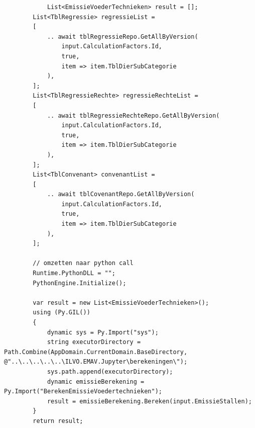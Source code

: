 \begin{listing}[H]
  \begin{verbatim}
            List<EmissieVoederTechnieken> result = [];
        List<TblRegressie> regressieList =
        [
            .. await tblRegressieRepo.GetAllByVersion(
                input.CalculationFactors.Id,
                true,
                item => item.TblDierSubCategorie
            ),
        ];
        List<TblRegressieRechte> regressieRechteList =
        [
            .. await tblRegressieRechteRepo.GetAllByVersion(
                input.CalculationFactors.Id,
                true,
                item => item.TblDierSubCategorie
            ),
        ];
        List<TblConvenant> convenantList =
        [
            .. await tblCovenantRepo.GetAllByVersion(
                input.CalculationFactors.Id,
                true,
                item => item.TblDierSubCategorie
            ),
        ];

        // omzetten naar python call
        Runtime.PythonDLL = "";
        PythonEngine.Initialize();

        var result = new List<EmissieVoederTechnieken>();
        using (Py.GIL())
        {
            dynamic sys = Py.Import("sys");
            string executorDirectory = Path.Combine(AppDomain.CurrentDomain.BaseDirectory, @"..\..\..\..\..\ILVO.EMAV.Jupyter\berekeningen\");
            sys.path.append(executorDirectory);
            dynamic emissieBerekening = Py.Import("BerekenEmissieVoedertechnieken");
            result = emissieBerekening.Bereken(input.EmissieStallen);
        }
        return result;


  \end{verbatim}
  \caption[csharp versie van berekenvoedertechnieken met python]{de C\# versie voor integratie met python module}
  \label{lst:berekenvoederemissiepythonandcsharp}
\end{listing}
